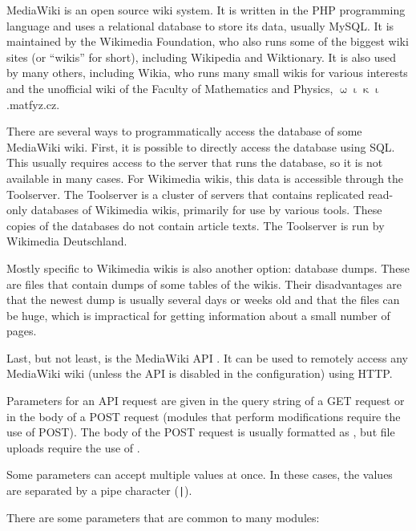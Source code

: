 
MediaWiki \cite{mediawiki} is an open source wiki system.
It is written in the \acs{PHP} programming language and uses a relational database to store its data,
usually MySQL.
It is maintained by the Wikimedia Foundation,
who also runs some of the biggest wiki sites (or “wikis” for short),
including Wikipedia and Wiktionary.
It is also used by many others, including Wikia, who runs many small wikis for various interests and
the unofficial wiki of the Faculty of Mathematics and Physics, $\upomega\upiota\upkappa\upiota$.matfyz.cz.

\medskip

There are several ways to programmatically access the database of some MediaWiki wiki.
First, it is possible to directly access the database using \ac{SQL}.
This usually requires access to the server that runs the database, so it is not available in many cases.
For Wikimedia wikis, this data is accessible through the Toolserver.
The Toolserver is a cluster of servers that contains replicated read-only databases of Wikimedia wikis,
primarily for use by various tools.
These copies of the databases do not contain article texts.
The Toolserver is run by Wikimedia Deutschland.

Mostly specific to Wikimedia wikis is also another option: database dumps. These are files that contain
dumps of some tables of the wikis. Their disadvantages are that the newest dump is usually several days or weeks old
and that the files can be huge, which is impractical for getting information about a small number of pages.

Last, but not least, is the MediaWiki API \cite{mediawiki-api}.
It can be used to remotely access any MediaWiki wiki (unless the \ac{API} is disabled in the configuration)
using \ac{HTTP}.

\medskip

Parameters for an \ac{API} request are given in the query string of a GET request or in the body of a POST request
(modules that perform modifications require the use of POST).
The body of the POST request is usually formatted as ,
but file uploads require the use of .

Some parameters can accept multiple values at once.
In these cases, the values are separated by a pipe character (\texttt{|}).

There are some parameters that are common to many modules:


